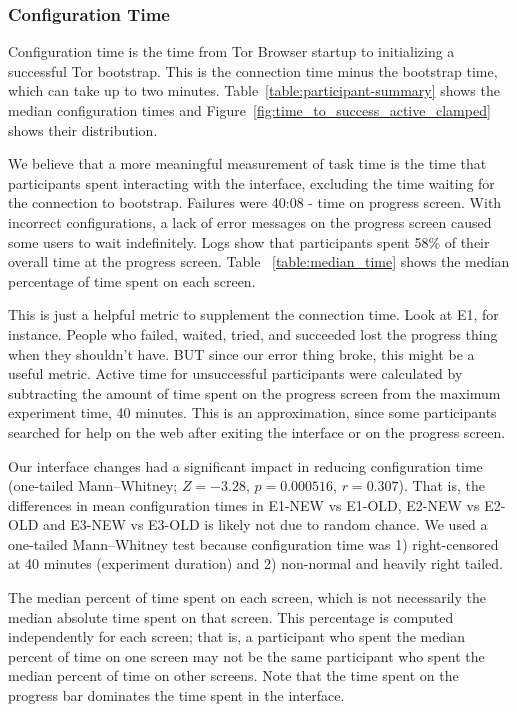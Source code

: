 \documentclass[USenglish,oneside,twocolumn]{article}
\begin{document}
\subsubsection{Configuration Time} 
{\color {blue} 
Configuration time is the time from Tor Browser startup to initializing a successful Tor bootstrap. This is the connection time minus the bootstrap time, which can take up to two minutes. Table~\ref{table:participant-summary} shows the median configuration times and Figure~\ref{fig:time_to_success_active_clamped} shows their distribution.

We believe that a more meaningful measurement of task time is the time that participants spent interacting with the interface, excluding the time waiting for the connection to bootstrap. Failures were 40:08 - time on progress screen. With incorrect configurations, a lack of error messages on the progress screen caused some users to wait indefinitely.  Logs show that participants spent 58\% of their overall time at the progress screen. Table ~\ref{table:median_time} shows the median percentage of time spent on each screen.

This is just a helpful metric to supplement the connection time. Look at E1, for instance. People who failed, waited, tried, and succeeded lost the progress thing when they shouldn't have. BUT since our error thing broke, this might be a useful metric. Active time for unsuccessful participants were calculated by subtracting the amount of time spent on the progress screen from the maximum experiment time, 40 minutes. This is an approximation, since some participants searched for help on the web after exiting the interface or on the progress screen. 

Our interface changes had a significant impact in reducing configuration time (one-tailed Mann--Whitney; $Z = -3.28$, $p = 0.000516$, $r = 0.307$). That is, the differences in mean configuration times in E1-NEW vs E1-OLD, E2-NEW vs E2-OLD and E3-NEW vs E3-OLD is likely not due to random chance. We used a one-tailed Mann--Whitney test because configuration time was 1) right-censored at 40 minutes (experiment duration) and 2) non-normal and heavily right tailed. 
}

\begin{table}[t]
\centering

\caption{The median percent of time spent on each screen, which is not
necessarily the median absolute time spent on that screen. 
This percentage is computed independently for each screen; that is, a participant who spent the median percent 
of time on one screen may not be the same participant who spent the median percent
of time on other screens. Note that the time spent on the progress bar dominates the 
time spent in the interface.} 
\label{table:median_time}
\end{table}
\end{document}

